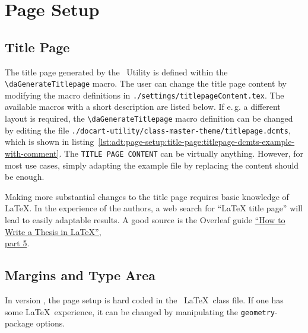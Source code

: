 	\newpage
	\section{Page Setup}
		\subsection{Title Page}
			\label{subsec:adt:page-setup:title-page}
			The title page generated by the \productName~Utility is defined within the \lstinline$\daGenerateTitlepage$ macro. The user can change the title page content by modifying the macro definitions in \lstinline$./settings/titlepageContent.tex$. The available macros with a short description are listed below.
			\lstset{style=LaTeX}
			If \mbox{e.\,g.} a different layout is required, the \lstinline$\daGenerateTitlepage$ macro definition can be changed by editing the file \lstinline$./docart-utility/class-master-theme/titlepage.dcmts$, which is shown in \mbox{listing \ref{lst:adt:page-setup:title-page:titlepage-dcmts-example-with-comment}}. 
			\lstset{style=LaTeX}
			The \lstinline$TITLE PAGE CONTENT$ can be virtually anything. However, for most use cases, simply adapting the example file by replacing the content should be enough.
			\begin{daWarningBox}
				Making more substantial changes to the title page requires basic knowledge of \LaTeX. In the experience of the authors, a web search for \enquote{LaTeX title page} will lead to easily adaptable results. A good source is the Overleaf guide \href{https://www.overleaf.com/learn/latex/How_to_Write_a_Thesis_in_LaTeX_(Part_5)\%3A_Customising_Your_Title_Page_and_Abstract}{\enquote{How to Write a Thesis in LaTeX},\\ part 5}.
			\end{daWarningBox}
		
		\newpage
		\subsection{Margins and Type Area}
			\vspace{-0.25cm}
			\begin{daWarningBox}
				In version \productVersion, the page setup is hard coded in the \productName~\LaTeX~class file. If one has some \LaTeX~experience, it can be changed by manipulating the \lstinline$geometry$-package options. 
			\end{daWarningBox}
		
